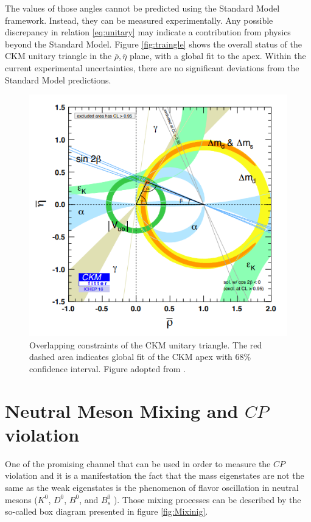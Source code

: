 The values of those angles cannot be predicted using the Standard Model framework. Instead, they can be measured experimentally. Any possible discrepancy in relation \ref{eq:unitary} may indicate a contribution from physics beyond the Standard Model. Figure \ref{fig:traingle} shows the overall status of the CKM unitary triangle in the $\overline{\rho}, \overline{\eta}$ plane, with a global fit to the apex. Within the current experimental uncertainties, there are no significant deviations from the Standard Model predictions. 

\begin{figure}
\centering
\includegraphics[scale=0.6]{figures/Unitary_triangle_constrains.PNG}
\caption{Overlapping constraints of the CKM unitary triangle. The red dashed area indicates global fit of the CKM apex with 68\% confidence interval. Figure adopted from \cite{CKMFitter}.
\label{fig:triangle}}
\end{figure}


\section{Neutral Meson Mixing and $CP$ violation}

One of the promising channel that can be used in order to measure the $CP$ violation and it is a manifestation the fact that the mass eigenstates are not the same as the weak eigenstates is the phenomenon of flavor oscillation in neutral mesons ($K^0$, $D^0$, $B^0$, and $B^0_ s$ ). 
Those mixing processes can be described by the so-called box diagram presented in figure \ref{fig:Mixinig}. 


